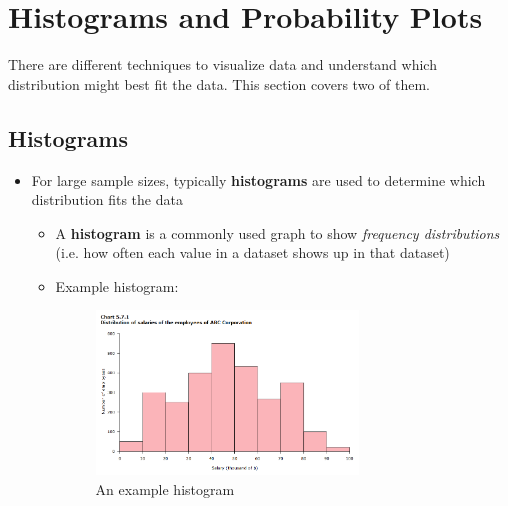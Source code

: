 \documentclass[12pt]{article}
\begin{document}
\section*{Histograms and Probability Plots}

There are different techniques to visualize data and understand which distribution might best fit the data. This section covers two of them.

\subsection*{Histograms}
\begin{itemize}
	\item For large sample sizes, typically \textbf{histograms} are used to
	      determine which distribution fits the data
	      \begin{itemize}
		      \item A \textbf{histogram} is a commonly used graph to show
		            \emph{frequency distributions} (i.e. how often each value in
		            a dataset shows up in that dataset)
		      \item Example histogram:
		            \begin{figure}[H]
			            \begin{center}
				            \includegraphics[width=0.7\textwidth]{1}
			            \end{center}
			            \caption{An example histogram}\label{fig:1}
		            \end{figure}
	      \end{itemize}
\end{itemize}
\end{document}
